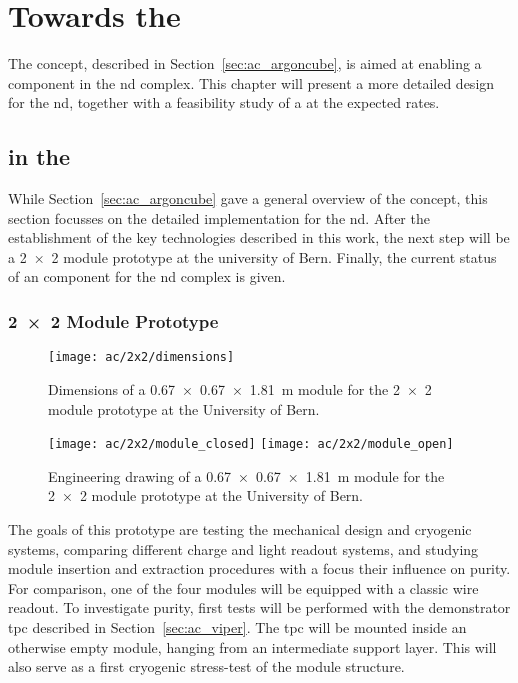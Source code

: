 \chapter{Towards the  }
\label{chap:dune-nd}

The \AC{} concept, described in Section~\ref{sec:ac_argoncube}, is aimed at enabling a \lartpc{} component in the \dune{} \gls{nd} complex.
This chapter will present a more detailed design for the \gls{nd}, together with a feasibility study of a \lartpc{} at the expected rates.


\section{\AC{} in the  }
\label{sec:dune-nd_ac}

While Section~\ref{sec:ac_argoncube} gave a general overview of the \AC{} concept, this section focusses on the detailed implementation for the \dune{} \gls{nd}.
After the establishment of the key technologies described in this work, the next step will be a \num{2 x 2} module prototype at the university of Bern.
Finally, the current status of an \AC{} \lartpc{} component for the \dune{} \gls{nd} complex is given.

\subsection{\num{2 x 2} Module Prototype}
\label{sec:dune-nd_ac_2x2}

\begin{figure}[htb]
	\centering
	\texttt{[image: ac/2x2/dimensions]}
	\caption{Dimensions of a \SI{0.67 x 0.67 x 1.81}{\metre} module for the \AC{} \num{2 x 2} module \AC{} prototype at the University of Bern.}
	\label{fig:2x2_dim}
\end{figure}

\begin{figure}[htb]
	\centering
	\texttt{[image: ac/2x2/module\_closed]}
	\texttt{[image: ac/2x2/module\_open]}
	\caption{Engineering drawing of a \SI{0.67 x 0.67 x 1.81}{\metre} module for the \AC{} \num{2 x 2} module \AC{} prototype at the University of Bern.}
	\label{fig:2x2_mod}
\end{figure}

The goals of this prototype are testing the mechanical design and cryogenic systems, comparing different charge and light readout systems, and studying module insertion and extraction procedures with a focus their influence on purity.
For comparison, one of the four modules will be equipped with a classic wire readout.
To investigate purity, first tests will be performed with the \AC{} demonstrator \gls{tpc} described in Section~\ref{sec:ac_viper}.
The \gls{tpc} will be mounted inside an otherwise empty module, hanging from an intermediate support layer.
This will also serve as a first cryogenic stress-test of the module structure.

